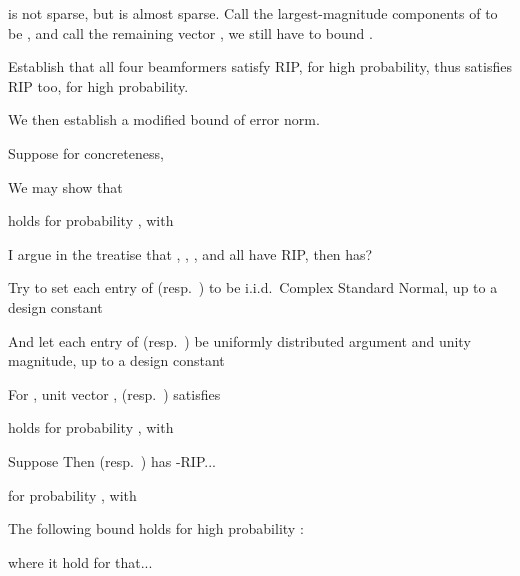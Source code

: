 {
\I {} is not sparse, but  is almost sparse.
Call the largest-magnitude  components of  to be , and call the remaining vector , we still have to bound .

\I Establish that all four beamformers satisfy RIP, for high probability, thus  satisfies RIP too, for high probability.

\I We then establish a modified bound of error norm.
}
{
\I Suppose for concreteness,

\I We may show that 

\I holds for probability , with
}
{
\I I argue in the treatise that , , , and  all have RIP, then  has?

\I Try to set each entry of  (resp.\ ) to be i.i.d.\ Complex Standard Normal, up to a design constant

\I And let each entry of  (resp.\ ) be uniformly distributed argument and unity magnitude, up to a design constant
}
{
\I For , unit vector ,  (resp.\ ) satisfies
%

\I holds for probability , with
}
{
\I Suppose
%
%
\I Then  (resp.\ ) has -RIP...

\I for probability , with
}
{
\I The following bound holds for high probability :

\I where it hold for  that...
}
